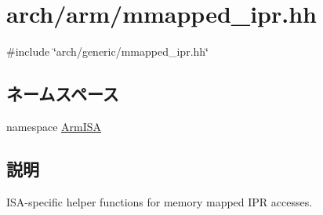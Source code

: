 \hypertarget{arm_2mmapped__ipr_8hh}{
\section{arch/arm/mmapped\_\-ipr.hh}
\label{arm_2mmapped__ipr_8hh}
}
{\ttfamily \#include \char`\"{}arch/generic/mmapped\_\-ipr.hh\char`\"{}}\par
\subsection*{ネームスペース}
\begin{DoxyCompactItemize}
\item 
namespace \hyperlink{namespaceArmISA}{ArmISA}
\end{DoxyCompactItemize}


\subsection{説明}
ISA-\/specific helper functions for memory mapped IPR accesses. 